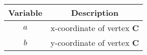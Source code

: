 \begin{tabular}[12pt]{ |c| c|}
    \hline
    \textbf{Variable} & \textbf{Description}\\
    \hline
    $a$ & x-coordinate of vertex \textbf{C}\\
    \hline
    $b$ & y-coordinate of vertex \textbf{C}\\
    \hline
    \end{tabular}
